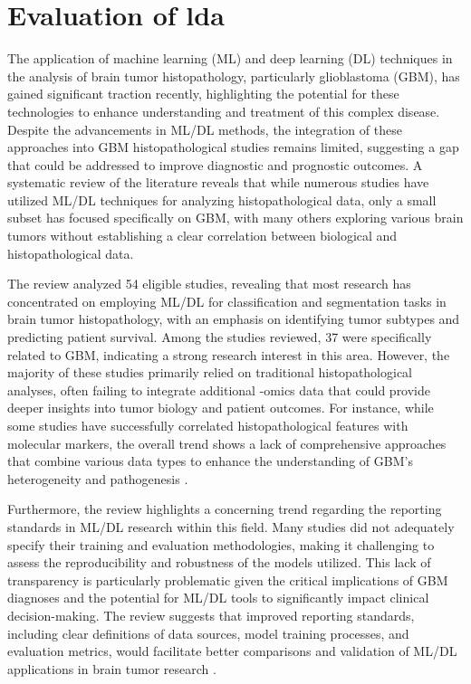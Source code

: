 \documentclass[runningheads]{llncs}
\begin{document}
\section{Evaluation of lda}
The application of machine learning (ML) and deep learning (DL) techniques in the analysis of brain tumor histopathology, particularly glioblastoma (GBM), has gained significant traction recently, highlighting the potential for these technologies to enhance understanding and treatment of this complex disease. Despite the advancements in ML/DL methods, the integration of these approaches into GBM histopathological studies remains limited, suggesting a gap that could be addressed to improve diagnostic and prognostic outcomes. A systematic review of the literature reveals that while numerous studies have utilized ML/DL techniques for analyzing histopathological data, only a small subset has focused specifically on GBM, with many others exploring various brain tumors without establishing a clear correlation between biological and histopathological data.

The review analyzed 54 eligible studies, revealing that most research has concentrated on employing ML/DL for classification and segmentation tasks in brain tumor histopathology, with an emphasis on identifying tumor subtypes and predicting patient survival. Among the studies reviewed, 37 were specifically related to GBM, indicating a strong research interest in this area. However, the majority of these studies primarily relied on traditional histopathological analyses, often failing to integrate additional -omics data that could provide deeper insights into tumor biology and patient outcomes. For instance, while some studies have successfully correlated histopathological features with molecular markers, the overall trend shows a lack of comprehensive approaches that combine various data types to enhance the understanding of GBM's heterogeneity and pathogenesis \cite{Chun_2025}.

Furthermore, the review highlights a concerning trend regarding the reporting standards in ML/DL research within this field. Many studies did not adequately specify their training and evaluation methodologies, making it challenging to assess the reproducibility and robustness of the models utilized. This lack of transparency is particularly problematic given the critical implications of GBM diagnoses and the potential for ML/DL tools to significantly impact clinical decision-making. The review suggests that improved reporting standards, including clear definitions of data sources, model training processes, and evaluation metrics, would facilitate better comparisons and validation of ML/DL applications in brain tumor research \cite{Chun_2025}.
\end{document}
